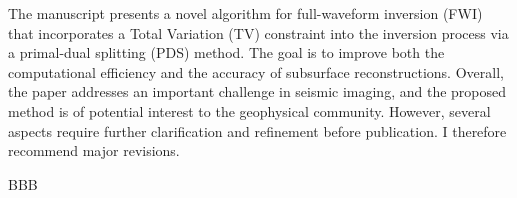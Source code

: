 \begin{pointGen}
	The manuscript presents a novel algorithm for full-waveform inversion (FWI) that incorporates a Total Variation (TV) constraint into the inversion process via a primal-dual splitting (PDS) method. The goal is to improve both the computational efficiency and the accuracy of subsurface reconstructions. Overall, the paper addresses an important challenge in seismic imaging, and the proposed method is of potential interest to the geophysical community. However, several aspects require further clarification and refinement before publication. I therefore recommend major revisions.
\end{pointGen}

\begin{reply}
	BBB
\end{reply}